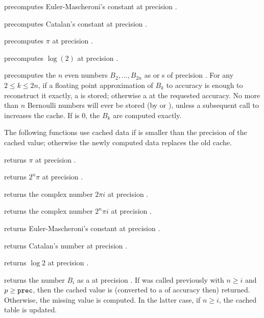  precomputes Euler-Mascheroni's constant
at precision .

 precomputes Catalan's constant at precision
.

 precomputes $\pi$ at precision .

 precomputes $\log(2)$ at precision
.

 precomputes the $n$ even
 numbers $B_2,\dots,B_{2n}$ as  or s of
precision . For any $2 \leq k \leq 2n$, if a floating point
approximation of $B_k$ to accuracy  is enough to reconstruct it
exactly, a  is stored; otherwise a  at the requested
accuracy. No more than $n$ Bernoulli numbers will ever be stored (by
 or ), unless a subsequent call to 
increases the cache. If  is $0$, the $B_k$ are computed exactly.

The following functions use cached data if  is smaller than the
precision of the cached value; otherwise the newly computed data replaces the
old cache.

 returns $\pi$ at precision .

 returns $2^n\pi$ at precision .

 returns the complex number $2\pi i$ at
precision .

 returns the complex number $2^n\pi i$ at
precision .

 returns Euler-Mascheroni's constant at
precision .

 returns Catalan's number at precision .

 returns $\log 2$ at precision .

 returns the  number
$B_i$ as a  at precision . If  was called previously with $n \geq i$ and $p \geq {\tt prec}$, then
the cached value is (converted to a  of accuracy  then)
returned. Otherwise, the missing value is computed. In the latter case,
if $n \geq i$, the cached table is updated.

